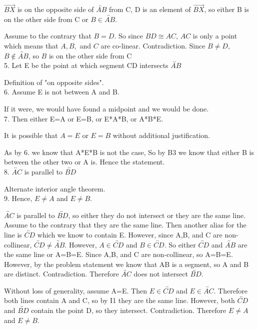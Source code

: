 \documentclass[12pt,letterpaper]{article}
\begin{document}
$\overrightarrow{BX}$ is on the opposite side of $\overleftrightarrow{AB}$ from C, D is an element of $\overrightarrow{BX}$, so either B is on the other side from C or $B\in \overleftrightarrow{AB}$.  

Assume to the contrary that $B=D$. So since $BD \cong AC$, $AC$ is only a point which means that $A,B,$ and $C$ are co-linear.  Contradiction. Since $B\neq D$, $B\not\in \overleftrightarrow{AB}$, so $B$ is on the other side from C\\


5. Let E be the point at which segment CD intersects $\overleftrightarrow{AB}$

Definition of "on opposite sides".\\


6. Assume E is not between A and B.  

If it were, we would have found a midpoint and we would be done.\\


7. Then either E=A or E=B, or E*A*B, or A*B*E.  

It is possible that $A=E$ or $E=B$ without additional justification.

As by 6. we know that A*E*B is not the case, So by B3 we know that either B is between the other two or A is. Hence the statement.\\


8. $\overleftrightarrow{AC}$ is parallel to $\overleftrightarrow{BD}$

Alternate interior angle theorem.\\


9. Hence, $E \neq A$ and $E \neq B$.  

$\overleftrightarrow{AC}$ is parallel to $\overleftrightarrow{BD}$, so either they do not intersect or they are the same line.  Assume to the contrary that they are the same line.  Then another alias for the line is $\overleftrightarrow{CD}$ which we know to contain E.  However, since A,B, and C are non-collinear, $\overleftrightarrow{CD} \neq \overleftrightarrow{AB}$.  However, $A\in \overleftrightarrow{CD}$ and $B\in \overleftrightarrow{CD}$.  So either $\overleftrightarrow{CD}$ and $\overleftrightarrow{AB}$ are the same line or A=B=E.  Since A,B, and C are non-collinear, so A=B=E.  However, by the problem statement we know that AB is a segment, so A and B are distinct.  Contradiction.  Therefore $\overleftrightarrow{AC}$ does not intersect $\overleftrightarrow{BD}$.

Without loss of generality, assume A=E.  Then $E \in \overleftrightarrow{CD}$ and $E\in \overleftrightarrow{AC}$.  Therefore both lines contain A and C, so by I1 they are the same line.  However, both $\overleftrightarrow{CD}$ and $\overleftrightarrow{BD}$ contain the point D, so they intersect.  Contradiction.  Therefore $E \neq A$ and $E\neq B$. \\
\end{document}
